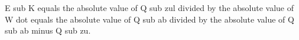 E sub K equals the absolute value of Q sub zul divided by the absolute value of W dot equals the absolute value of Q sub ab divided by the absolute value of Q sub ab minus Q sub zu.